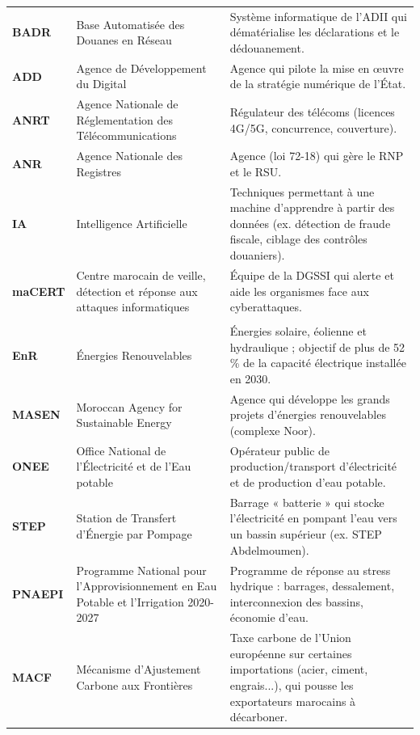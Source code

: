 {\begin{longtable}{|p{1.8cm}|p{4.9cm}|p{8.8cm}|}
\rowcolor{blue!8} \multicolumn{3}{|l|}{\textbf{Numérique, données et cybersécurité}} \\ \hline
\textbf{BADR} & Base Automatisée des Douanes en Réseau & Système informatique de l'ADII qui dématérialise les déclarations et le dédouanement. \\ \hline
\textbf{ADD} & Agence de Développement du Digital & Agence qui pilote la mise en œuvre de la stratégie numérique de l'État. \\ \hline
\textbf{ANRT} & Agence Nationale de Réglementation des Télécommunications & Régulateur des télécoms (licences 4G/5G, concurrence, couverture). \\ \hline
\textbf{ANR} & Agence Nationale des Registres & Agence (loi 72-18) qui gère le RNP et le RSU. \\ \hline
\textbf{IA} & Intelligence Artificielle & Techniques permettant à une machine d'apprendre à partir des données (ex. détection de fraude fiscale, ciblage des contrôles douaniers). \\ \hline
\textbf{maCERT} & Centre marocain de veille, détection et réponse aux attaques informatiques & Équipe de la DGSSI qui alerte et aide les organismes face aux cyberattaques. \\ \hline
\rowcolor{blue!8} \multicolumn{3}{|l|}{\textbf{Énergie, eau et développement durable}} \\ \hline
\textbf{EnR} & Énergies Renouvelables & Énergies solaire, éolienne et hydraulique ; objectif de plus de 52 \% de la capacité électrique installée en 2030. \\ \hline
\textbf{MASEN} & Moroccan Agency for Sustainable Energy & Agence qui développe les grands projets d'énergies renouvelables (complexe Noor). \\ \hline
\textbf{ONEE} & Office National de l'Électricité et de l'Eau potable & Opérateur public de production/transport d'électricité et de production d'eau potable. \\ \hline
\textbf{STEP} & Station de Transfert d'Énergie par Pompage & Barrage « batterie » qui stocke l'électricité en pompant l'eau vers un bassin supérieur (ex. STEP Abdelmoumen). \\ \hline
\textbf{PNAEPI} & Programme National pour l'Approvisionnement en Eau Potable et l'Irrigation 2020-2027 & Programme de réponse au stress hydrique : barrages, dessalement, interconnexion des bassins, économie d'eau. \\ \hline
\textbf{MACF} & Mécanisme d'Ajustement Carbone aux Frontières & Taxe carbone de l'Union européenne sur certaines importations (acier, ciment, engrais...), qui pousse les exportateurs marocains à décarboner. \\ \hline

\end{longtable}}
